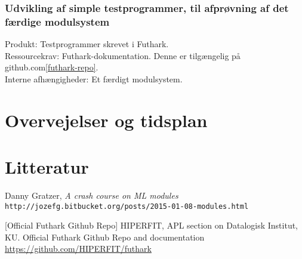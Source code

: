 \documentclass[12pt]{article}
\begin{document}
\subsubsection{Udvikling af simple testprogrammer, til afprøvning 
af det færdige modulsystem}
Produkt: Testprogrammer skrevet i Futhark. \\
Ressourcekrav: Futhark-dokumentation. Denne er tilgængelig på github.com\ref{futhark-repo}.\\
Interne afhængigheder: Et færdigt modulsystem.
\section{Overvejelser og tidsplan}
\section{Litteratur}

\begin{thebibliography}{4}

Danny Gratzer, \textit{A crash course on ML modules}
\texttt{http://jozefg.bitbucket.org/posts/2015-01-08-modules.html}

[Official Futhark Github Repo]
HIPERFIT, APL section on Datalogisk Institut, KU.
Official Futhark Github Repo and documentation
\url{https://github.com/HIPERFIT/futhark}
\end{thebibliography}
\end{document}
